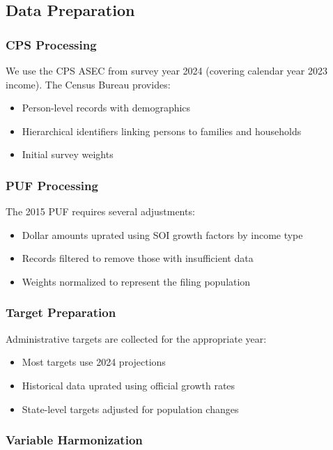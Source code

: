 \subsection{Data Preparation}

\subsubsection{CPS Processing}

We use the CPS ASEC from survey year 2024 (covering calendar year 2023 income). The Census Bureau provides:
\begin{itemize}
\item Person-level records with demographics
\item Hierarchical identifiers linking persons to families and households
\item Initial survey weights
\end{itemize}

\subsubsection{PUF Processing}

The 2015 PUF requires several adjustments:
\begin{itemize}
\item Dollar amounts uprated using SOI growth factors by income type
\item Records filtered to remove those with insufficient data
\item Weights normalized to represent the filing population
\end{itemize}

\subsubsection{Target Preparation}

Administrative targets are collected for the appropriate year:
\begin{itemize}
\item Most targets use 2024 projections
\item Historical data uprated using official growth rates
\item State-level targets adjusted for population changes
\end{itemize}

\subsubsection{Variable Harmonization}

